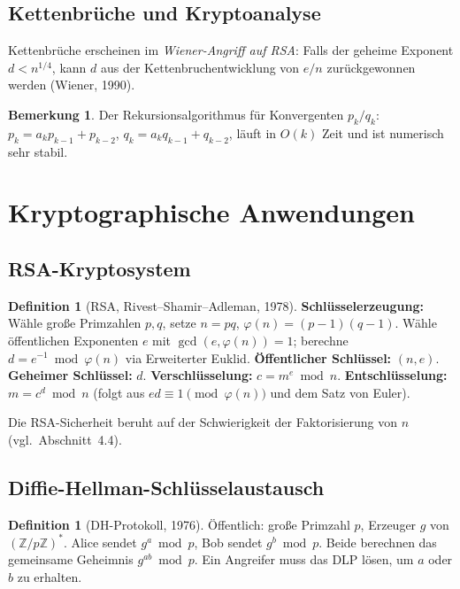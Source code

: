 \documentclass[12pt,a4paper]{amsart}
\theoremstyle{definition}
\newtheorem{definition}[theorem]{Definition}
\newtheorem{bemerkung}[theorem]{Bemerkung}
\begin{document}
\subsection{Kettenbrüche und Kryptoanalyse}

Kettenbrüche erscheinen im \emph{Wiener-Angriff auf RSA}: Falls der geheime
Exponent $d < n^{1/4}$, kann $d$ aus der Kettenbruchentwicklung von $e/n$
zurückgewonnen werden (Wiener, 1990).

\begin{bemerkung}
Der Rekursionsalgorithmus für Konvergenten $p_k/q_k$:
$p_k = a_k p_{k-1} + p_{k-2}$, $q_k = a_k q_{k-1} + q_{k-2}$,
läuft in $O(k)$ Zeit und ist numerisch sehr stabil.
\end{bemerkung}

\section{Kryptographische Anwendungen}

\subsection{RSA-Kryptosystem}

\begin{definition}[RSA, Rivest--Shamir--Adleman, 1978]
\textbf{Schlüsselerzeugung:} Wähle große Primzahlen $p,q$, setze $n = pq$,
$\varphi(n) = (p-1)(q-1)$. Wähle öffentlichen Exponenten $e$ mit
$\gcd(e, \varphi(n)) = 1$; berechne $d = e^{-1} \bmod \varphi(n)$ via
Erweiterter Euklid. \textbf{Öffentlicher Schlüssel:} $(n, e)$.
\textbf{Geheimer Schlüssel:} $d$.
\textbf{Verschlüsselung:} $c = m^e \bmod n$.
\textbf{Entschlüsselung:} $m = c^d \bmod n$ (folgt aus $ed \equiv 1 \pmod{\varphi(n)}$
und dem Satz von Euler).
\end{definition}

Die RSA-Sicherheit beruht auf der Schwierigkeit der Faktorisierung von $n$
(vgl.\ Abschnitt~4.4).

\subsection{Diffie-Hellman-Schlüsselaustausch}

\begin{definition}[DH-Protokoll, 1976]
Öffentlich: große Primzahl $p$, Erzeuger $g$ von $(\mathbb{Z}/p\mathbb{Z})^*$.
Alice sendet $g^a \bmod p$, Bob sendet $g^b \bmod p$. Beide berechnen das
gemeinsame Geheimnis $g^{ab} \bmod p$. Ein Angreifer muss das DLP lösen,
um $a$ oder $b$ zu erhalten.
\end{definition}
\end{document}
